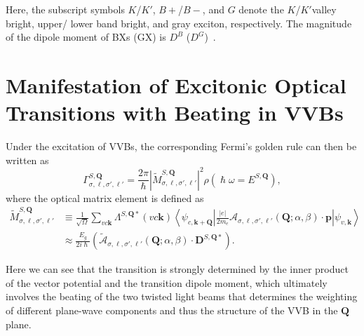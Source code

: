 \noindent
Here, the subscript symbols $K$/$K'$, $B+$/$B-$, and $G$ denote the $K$/$K'$valley bright, upper/ lower band bright, and gray exciton, respectively. The magnitude of the dipole moment of BXs (GX) is $D^{B}$ ($D^G$)~\cite{peng2022tailoring, sanchez2024enhanced}. 

%
%
%
%
%
%

\section{Manifestation of Excitonic Optical Transitions with Beating in VVBs}
Under the excitation of VVBs, the corresponding Fermi's golden rule can then be written as~\cite{sanchez2024enhanced}
\begin{equation}
\Gamma_{\sigma, \ell, \sigma', \ell'}^{S, \boldsymbol{Q}}
=
\frac{2\pi}{\hslash}
\left|
\tilde{M}_{\sigma, \ell, \sigma', \ell'}^{S, \boldsymbol{Q}}
\right|^2
\rho(\hslash\omega=E^{S, \boldsymbol{Q}}),
\label{transitionrate}
\end{equation}
where the optical matrix element is defined as
\begin{align}
\tilde{M}_{\sigma, \ell, \sigma', \ell'}^{S, \boldsymbol{Q}}
&\equiv
\frac{1}{\sqrt{\Omega}} 
\sum_{vc\boldsymbol{k}} 
\Lambda^{S,\boldsymbol{Q}*}(vc\boldsymbol{k}) 
\left\langle
\psi_{c, \boldsymbol{k}+\boldsymbol{Q}}
\left|
\frac{|e|}{2m_e}
\boldsymbol{\mathcal{A}}_{\sigma, \ell, \sigma', \ell'}(\boldsymbol{Q};\alpha,\beta)
\cdot
\boldsymbol{p}
\right|
\psi_{v, \boldsymbol{k}}
\right\rangle \nonumber \\
&\approx
\frac{E_g}{2i\hslash}
\left(
\tilde{\boldsymbol{\mathcal{A}}}_{\sigma, \ell, \sigma', \ell'}(\boldsymbol{Q};\alpha,\beta)
\cdot 
\boldsymbol{D}^{S, \boldsymbol{Q} *}
\right).
\label{matrixelement}
\end{align}

\begingroup
\color{red} %
\noindent
Here we can see that the transition is strongly determined by the inner product of the vector potential and the transition dipole moment, which ultimately involves the beating of the two twisted light beams that determines the weighting of different plane-wave components and thus the structure of the VVB in the $\boldsymbol{Q}$ plane.

